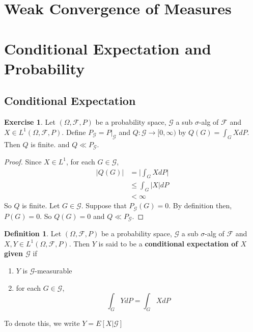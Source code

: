 \documentclass[12pt]{amsart}
\theoremstyle{definition}
\newtheorem{defn}[definition]{Definition}
\newtheorem{ex}[definition]{Exercise}
\newcommand{\sig}{\sigma}
\newcommand{\Om}{\Omega}
\newcommand{\MF}{\mathcal{F}}
\newcommand{\MG}{\mathcal{G}}
\begin{document}
	
	
	
	
	
	
	
	
	
	
	
	
	
	
	
	
	
	\newpage
	\section{Weak Convergence of Measures}
	
	
	
	
	
	
	
	
	
	
	
	
	
	
	
	
	
	
	
	
	\newpage
	\section{Conditional Expectation and Probability}
	\subsection{Conditional Expectation}
	
	\begin{ex}
	Let $(\Om, \MF, P)$ be a probability space, $\MG$ a sub $\sig$-alg of $\MF$ and $X \in L^1(\Om, \MF, P)$. Define $P_{\MG} = P|_{\MG}$ and $Q: \MG \rightarrow [0,\infty)$ by $Q(G) = \int_G X d P $. Then $Q$ is finite. and $Q \ll P_{\MG}$. 
	\end{ex}	
	
	\begin{proof}
	Since $X \in L^1$, for each $G \in \MG$, 
	\begin{align*}
	|Q(G)|
	&= \bigg| \int_G X dP \bigg| \\
	& \leq \int_G |X| dP \\
	& < \infty
	\end{align*}
	So $Q$ is finite. Let $G \in \MG$. Suppose that $P_{\MG}(G) = 0$. By definition then, $P(G) = 0$. So $Q(G) = 0$ and $Q \ll P_{\MG}$.
	\end{proof}
	
	\begin{defn}
	Let $(\Om, \MF, P)$ be a probability space, $\MG$ a sub $\sig$-alg of $\MF$ and $X, Y \in L^1(\Om, \MF, P)$. Then $Y $ is said to be a \textbf{conditional expectation of $X$ given $\MG$} if 
	\begin{enumerate}
	\item $Y$ is $\MG$-measurable
	\item for each $G \in \MG$, 
	$$\int_G Y dP = \int_G X dP$$ 
	\end{enumerate}	 
	To denote this, we write $Y = E[X|\MG]$
	\end{defn}		
	
\end{document}
